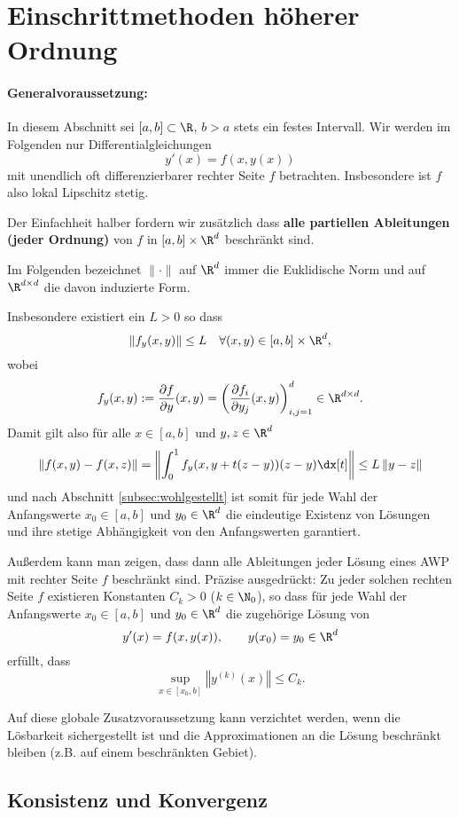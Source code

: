 \documentclass[
]{mycourse}
\theoremstyle{mythm}
\theoremstyle{break}
\newcommand{\norm}[1]{\left\Vert#1\right\Vert}		%
\begin{document}
\section{Einschrittmethoden höherer Ordnung}

\paragraph{Generalvoraussetzung:} 

In diesem Abschnitt sei $[a,b]\subset \R$, $b>a$ stets ein festes Intervall. Wir werden im Folgenden nur Differentialgleichungen
\[
y'(x)=f(x,y(x))
\]
mit unendlich oft differenzierbarer rechter Seite $f$ betrachten. Insbesondere ist $f$ also lokal Lipschitz stetig.

Der Einfachheit halber fordern wir zusätzlich dass \textbf{alle partiellen Ableitungen (jeder Ordnung)} von $f$ in $[a,b]\times \R^d$ beschränkt sind.
\begin{note}
	Im Folgenden bezeichnet $\|\cdot\|$ auf $\R^d$ immer die Euklidische Norm und auf $\R^{d\times d}$ die davon induzierte Form.
\end{note}
Insbesondere existiert ein $L>0$ so dass
\[
\norm{f_y(x,y)}\leq L \quad \forall (x,y)\in [a,b]\times \R^d,
\]
wobei 
\[
f_y(x,y):=\frac{\partial f}{\partial y} (x,y)= \left( \frac{\partial f_i}{\partial y_j}(x,y) \right)_{i,j=1}^d\in \R^{d\times d}.
\]
Damit gilt also für alle $x\in [a,b]$ und $y,z\in \R^d$ 
\[
\norm{f(x,y)-f(x,z)}=\norm{\int_0^1 f_y(x,y+t(z-y)) (z-y) \dx[t]}\leq L \norm{y-z}
\]
und nach Abschnitt \ref{subsec:wohlgestellt} ist somit für jede Wahl der Anfangswerte $x_0\in [a,b]$ und $y_0\in \R^d$ die eindeutige Existenz von Lösungen und ihre stetige Abhängigkeit von den Anfangswerten garantiert.

Außerdem kann man zeigen, dass dann alle Ableitungen jeder Lösung eines AWP mit rechter 
Seite $f$ beschränkt sind. Präzise ausgedrückt: Zu jeder solchen rechten Seite $f$ existieren Konstanten $C_k>0$ ($k\in \N_0$), so dass für jede Wahl der Anfangswerte $x_0\in [a,b]$ und $y_0\in \R^d$ die zugehörige 
Lösung von 
\[
y'(x)=f(x,y(x)), \qquad y(x_0)=y_0\in \R^d
\]
erfüllt, dass
\[
\sup_{x\in [x_0,b]} \norm{y^{(k)}(x)} \leq C_k.
\]

Auf diese globale Zusatzvoraussetzung kann verzichtet werden, wenn die Lösbarkeit sichergestellt ist und die Approximationen an die Lösung beschränkt bleiben (z.B. auf einem beschränkten Gebiet).


\subsection{Konsistenz und Konvergenz}\label{subsect:ConsitencyOrder}
\end{document}
